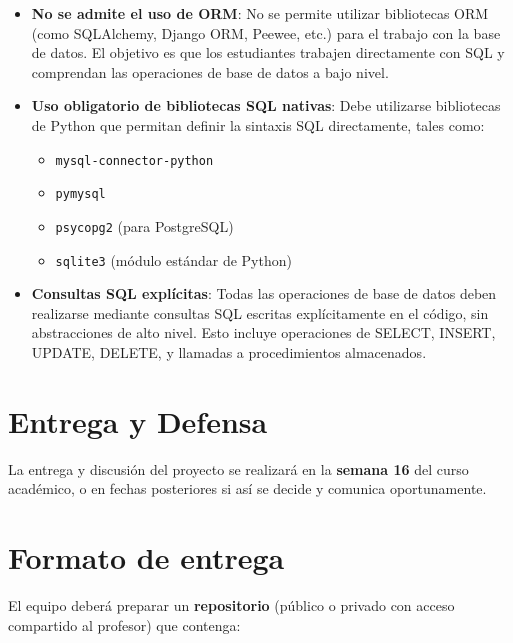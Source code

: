 \documentclass[10pt]{article}
\begin{document}
	\begin{itemize}
		\item \textbf{No se admite el uso de ORM}: No se permite utilizar bibliotecas ORM (como SQLAlchemy, Django ORM, Peewee, etc.) para el trabajo con la base de datos. El objetivo es que los estudiantes trabajen directamente con SQL y comprendan las operaciones de base de datos a bajo nivel.
		
		\item \textbf{Uso obligatorio de bibliotecas SQL nativas}: Debe utilizarse bibliotecas de Python que permitan definir la sintaxis SQL directamente, tales como:
		\begin{itemize}
			\item \texttt{mysql-connector-python}
			\item \texttt{pymysql}
			\item \texttt{psycopg2} (para PostgreSQL)
			\item \texttt{sqlite3} (módulo estándar de Python)
		\end{itemize}
		
		\item \textbf{Consultas SQL explícitas}: Todas las operaciones de base de datos deben realizarse mediante consultas SQL escritas explícitamente en el código, sin abstracciones de alto nivel. Esto incluye operaciones de SELECT, INSERT, UPDATE, DELETE, y llamadas a procedimientos almacenados.
		
	\end{itemize}
	
	\section*{Entrega y Defensa}
	
	La entrega y discusión del proyecto se realizará en la \textbf{semana 16} del curso académico, o en fechas posteriores si así se decide y comunica oportunamente.
	
	\section*{Formato de entrega}
	
	El equipo deberá preparar un \textbf{repositorio} (público o privado con acceso compartido al profesor) que contenga:
	
\end{document}
